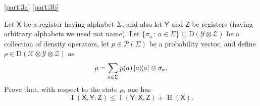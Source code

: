 \documentclass[boxes,pages,color=SeaGreen]{homework}
\renewcommand{\op}[1]{\operatorname{#1}}
\newcommand{\X}{\mathcal{X}}
\newcommand{\Y}{\mathcal{Y}}
\newcommand{\Z}{\mathcal{Z}}
\renewcommand{\P}{\mathcal{P}}
\newcommand{\reg}[1]{\mathsf{#1}}
\newcommand{\Density}{\mathrm{D}}
\begin{document}
\begin{solution}
    \ref{part:3a}
    \ref{part:3b}
\end{solution}


\begin{problem}
Let $\reg{X}$ be a register having alphabet $\Sigma$, and also let
$\reg{Y}$ and $\reg{Z}$ be registers (having arbitrary alphabets we need
not name).
Let $\{\sigma_a\,:\,a\in\Sigma\}\subseteq\Density(\Y\otimes\Z)$
be a collection of density operators, let $p\in\P(\Sigma)$ be a probability
vector, and define $\rho\in\Density(\X\otimes\Y\otimes\Z)$ as
\[
    \rho = \sum_{a\in\Sigma} p(a) \ketbra{a} \otimes \sigma_a.
\]
Prove that, with respect to the state $\rho$, one has
\[
    \op{I}(\reg{X},\reg{Y} : \reg{Z})
    \leq \op{I}(\reg{Y}:\reg{X},\reg{Z}) + \op{H}(\reg{X}).
\]
\end{problem}
\end{document}
